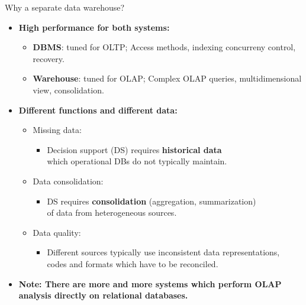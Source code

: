 \documentclass[aspectratio=169,t]{beamer}
\begin{document}
  { 
    \begin{frame}{Why a separate data warehouse?}
    \begin{itemize}
      \item \textbf{High performance for both systems:}
      \begin{itemize}
        \item \textbf{\color{airforceblue}DBMS}: tuned for OLTP; Access methods, indexing concurreny control, recovery.
        \item \textbf{\color{airforceblue}Warehouse}: tuned for OLAP; Complex OLAP queries, multidimensional view, consolidation.
      \end{itemize}
      \item \textbf{Different functions and different data:}
      \begin{itemize}
        \item Missing data:
        \begin{itemize}
          \item Decision support (DS) requires \textbf{\color{airforceblue}historical data} \\ which operational DBs do not typically maintain.
        \end{itemize}
        \item Data consolidation:
        \begin{itemize}
          \item DS requires \textbf{\color{airforceblue}consolidation} (aggregation, summarization) \\
          of data from heterogeneous sources.
        \end{itemize}
        \item Data quality:
        \begin{itemize}
          \item Different sources typically use inconsistent data representations, \\ codes and formats which have to be reconciled.
        \end{itemize}
      \end{itemize}
      \item \textbf{Note: There are more and more systems which perform OLAP\\ analysis directly on relational databases.}
    \end{itemize}
    \end{frame}
  }

  { 
    \begin{frame}{}

    \end{frame}
  }
\end{document}
